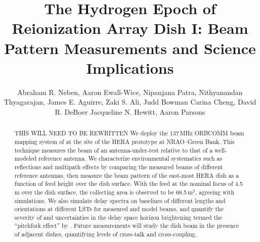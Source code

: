\documentclass{emulateapj}
\begin{document}
\title{The Hydrogen Epoch of Reionization Array Dish I: Beam Pattern Measurements and Science Implications}


\author{Abraham R. Neben,
Aaron Ewall-Wice,
Nipanjana Patra,
Nithyanandan Thyagarajan,
James E. Aguirre,
Zaki S. Ali,
Judd Bowman
Carina Cheng,
David R. DeBoer
Jacqueline N. Hewitt,
Aaron Parsons}




\begin{abstract}
THIS WILL NEED TO BE REWRITTEN
We deploy the 137\,MHz ORBCOMM beam mapping system of \citet{neben15} at the site of the HERA prototype at NRAO--Green Bank. This technique measures the beam of an antenna-under-test relative to that of a well-modeled reference antenna. We characterize environmental systematics such as reflections and multipath effects by comparing the measured beams of different reference antennas, then measure the beam pattern of the east-most HERA dish as a function of feed height over the dish surface. With the feed at the nominal focus of 4.5\,m over the dish surface, the collecting area is observed to be 68.5\,m$^2$, agreeing with simulations. We also simulate delay spectra on baselines of different lengths and orientations at different LSTs for measured and model beams, and quantify the severity of and uncertainties in the delay space horizon brightening termed the ``pitchfork effect'' by \citet{nithya15}. Future measurements will study the dish beam in the presence of adjacent dishes, quantifying levels of cross-talk and cross-coupling.
\end{abstract}
\end{document}
